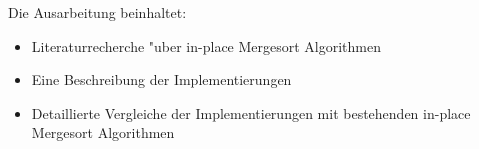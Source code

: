 \documentclass[12pt,pdftex,a4paper]{article}
\begin{document}
Die Ausarbeitung beinhaltet: 
\begin{itemize}
\item Literaturrecherche "uber in-place Mergesort Algorithmen
\item Eine Beschreibung der Implementierungen
\item Detaillierte Vergleiche der Implementierungen mit bestehenden in-place Mergesort Algorithmen
\end{itemize}
	

\end{document}
